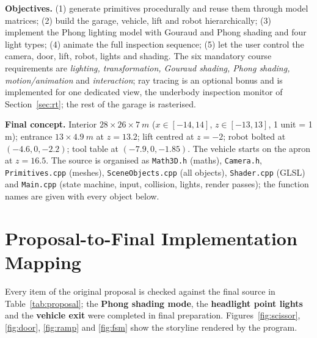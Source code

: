 \documentclass[10pt,a4paper]{article}
\newcommand{\fn}[1]{\texttt{#1}}
\begin{document}
\textbf{Objectives.} (1) generate primitives procedurally and reuse them through model matrices; (2) build the
garage, vehicle, lift and robot hierarchically; (3) implement the Phong lighting model with Gouraud and Phong
shading and four light types; (4) animate the full inspection sequence; (5) let the user control the camera,
door, lift, robot, lights and shading. The six mandatory course requirements are \emph{lighting, transformation,
Gouraud shading, Phong shading, motion/animation} and \emph{interaction}; ray tracing is an optional bonus and is implemented for one dedicated view, the underbody inspection monitor of Section~\ref{sec:rt}; the rest of the garage is rasterised.

\textbf{Final concept.} Interior $28\times26\times\SI{7}{m}$ ($x\in[-14,14]$, $z\in[-13,13]$, 1 unit = 1 m); entrance
$13\times\SI{4.9}{m}$ at $z=13.2$; lift centred at $z=-2$; robot bolted at $(-4.6,0,-2.2)$; tool table at
$(-7.9,0,-1.85)$. The vehicle starts on the apron at $z=16.5$. The source is organised as \fn{Math3D.h} (maths),
\fn{Camera.h}, \fn{Primitives.cpp} (meshes), \fn{SceneObjects.cpp} (all objects), \fn{Shader.cpp} (GLSL) and
\fn{Main.cpp} (state machine, input, collision, lights, render passes); the function names are given with every
object below.

\section{Proposal-to-Final Implementation Mapping}\label{sec:proposal}
Every item of the original proposal is checked against the final source in Table~\ref{tab:proposal}; the
\textbf{Phong shading mode}, the \textbf{headlight point lights} and the \textbf{vehicle exit} were completed in
final preparation. Figures~\ref{fig:scissor}, \ref{fig:door}, \ref{fig:ramp} and \ref{fig:fsm} show the storyline rendered by the program.
\end{document}
